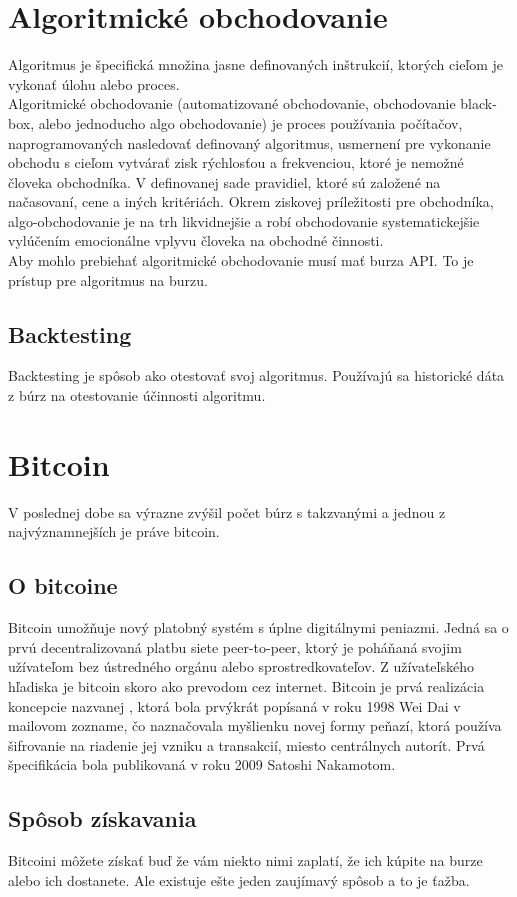 \section{Algoritmické obchodovanie}
Algoritmus je špecifická množina jasne definovaných inštrukcií, ktorých cieľom je vykonať úlohu alebo proces. \\
Algoritmické obchodovanie (automatizované obchodovanie, obchodovanie black-box, alebo jednoducho algo obchodovanie) je proces používania počítačov, naprogramovaných nasledovať definovaný algoritmus, usmernení pre vykonanie obchodu s cieľom vytvárať zisk rýchlosťou a frekvenciou, ktoré je nemožné človeka obchodníka. V definovanej sade pravidiel, ktoré sú založené na načasovaní, cene a iných kritériách. Okrem ziskovej príležitosti pre obchodníka, algo-obchodovanie je na trh likvidnejšie a robí obchodovanie systematickejšie vylúčením emocionálne vplyvu človeka na obchodné činnosti.\cite{Ba} \\
Aby mohlo prebiehať algoritmické obchodovanie musí mať burza API. To je prístup pre algoritmus na burzu.
\subsection{Backtesting} 
Backtesting je spôsob ako otestovať svoj algoritmus. Používajú sa historické dáta z búrz na otestovanie účinnosti algoritmu.
\section{Bitcoin} 
V poslednej dobe sa výrazne zvýšil počet búrz s takzvanými  a jednou z najvýznamnejších je práve bitcoin.
\subsection{O bitcoine} 
Bitcoin umožňuje nový platobný systém s úplne digitálnymi peniazmi. Jedná sa o prvú decentralizovaná platbu siete peer-to-peer, ktorý je poháňaná svojim užívateľom bez ústredného orgánu alebo sprostredkovateľov. Z užívateľského hľadiska je bitcoin skoro ako prevodom cez internet. Bitcoin je prvá realizácia koncepcie nazvanej , ktorá bola prvýkrát popísaná v roku 1998 Wei Dai v  mailovom zozname, čo naznačovala myšlienku novej formy peňazí, ktorá používa šifrovanie na riadenie jej vzniku a transakcií, miesto centrálnych autorít.  Prvá špecifikácia bola publikovaná v roku 2009  Satoshi Nakamotom. 
\subsection{Spôsob získavania} 
Bitcoini môžete získať buď že vám niekto nimi zaplatí, že ich kúpite na burze alebo ich dostanete. Ale existuje ešte jeden zaujímavý spôsob a to je ťažba. 
